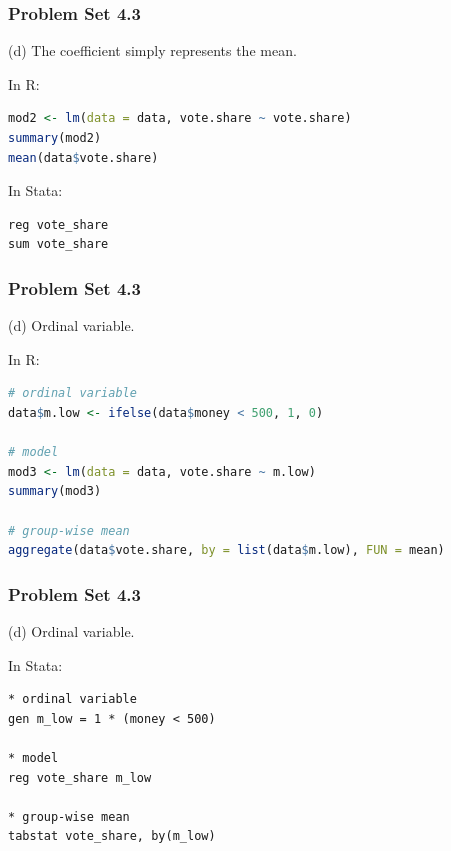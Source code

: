 \documentclass[xcolor=table]{beamer}
\begin{document}
\begin{frame}[fragile]
\frametitle{Problem Set 4.3}
(d) The coefficient simply represents the mean. \pause 

In R:
\begin{lstlisting}[language = R]
mod2 <- lm(data = data, vote.share ~ vote.share)
summary(mod2)
mean(data$vote.share)
\end{lstlisting} \pause

In Stata:
\begin{lstlisting}
reg vote_share
sum vote_share
\end{lstlisting}
\end{frame}


\begin{frame}[fragile]
\frametitle{Problem Set 4.3}
(d) Ordinal variable. \pause 

In R:
\begin{lstlisting}[language = R]
# ordinal variable
data$m.low <- ifelse(data$money < 500, 1, 0)

# model
mod3 <- lm(data = data, vote.share ~ m.low)
summary(mod3)

# group-wise mean
aggregate(data$vote.share, by = list(data$m.low), FUN = mean)
\end{lstlisting}
\end{frame}

\begin{frame}[fragile]
\frametitle{Problem Set 4.3}
(d) Ordinal variable. \pause 

In Stata:
\begin{lstlisting}
* ordinal variable
gen m_low = 1 * (money < 500)

* model
reg vote_share m_low

* group-wise mean
tabstat vote_share, by(m_low)
\end{lstlisting}
\end{frame}

\end{document}
